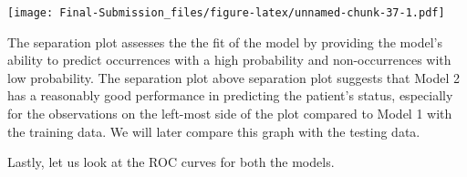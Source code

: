 \documentclass[
]{article}
\newenvironment{Shaded}{\begin{snugshade}}{\end{snugshade}}
\newcommand{\AttributeTok}[1]{\textcolor[rgb]{0.13,0.29,0.53}{#1}}
\newcommand{\CommentTok}[1]{\textcolor[rgb]{0.56,0.35,0.01}{\textit{#1}}}
\newcommand{\ConstantTok}[1]{\textcolor[rgb]{0.56,0.35,0.01}{#1}}
\newcommand{\DecValTok}[1]{\textcolor[rgb]{0.00,0.00,0.81}{#1}}
\newcommand{\DocumentationTok}[1]{\textcolor[rgb]{0.56,0.35,0.01}{\textbf{\textit{#1}}}}
\newcommand{\FunctionTok}[1]{\textcolor[rgb]{0.13,0.29,0.53}{\textbf{#1}}}
\newcommand{\NormalTok}[1]{#1}
\newcommand{\OtherTok}[1]{\textcolor[rgb]{0.56,0.35,0.01}{#1}}
\newcommand{\SpecialCharTok}[1]{\textcolor[rgb]{0.81,0.36,0.00}{\textbf{#1}}}
\newcommand{\StringTok}[1]{\textcolor[rgb]{0.31,0.60,0.02}{#1}}
\begin{document}
\begin{Shaded}
\end{Shaded}

\texttt{[image: Final-Submission\_files/figure-latex/unnamed-chunk-37-1.pdf]}

The separation plot assesses the the fit of the model by providing the
model's ability to predict occurrences with a high probability and
non-occurrences with low probability. The separation plot above
separation plot suggests that Model 2 has a reasonably good performance
in predicting the patient's status, especially for the observations on
the left-most side of the plot compared to Model 1 with the training
data. We will later compare this graph with the testing data.

Lastly, let us look at the ROC curves for both the models.

\begin{Shaded}
\end{Shaded}
\end{document}
